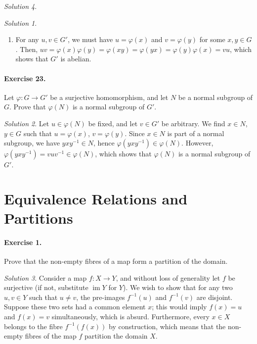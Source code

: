 \documentclass[11pt]{report}
\DeclareMathOperator\im{im}
\theoremstyle{remark}
\newtheorem*{solution}{Solution}
\begin{document}
\begin{solution}
\begin{solution}
\begin{enumerate}
        \item For any $u, v \in G'$, we must have $u = \varphi(x)$ and $v =
        \varphi(y)$ for some $x, y \in G$. Then, $uv = \varphi(x)\varphi(y) =
        \varphi(xy) = \varphi(yx) = \varphi(y)\varphi(x) = vu$, which shows that
        $G'$ is abelian.
    \end{enumerate}    
    \end{solution}
    
    \paragraph{Exercise 23.} Let $\varphi\colon G \to G'$ be a surjective
    homomorphism, and let $N$ be a normal subgroup of $G$. Prove that $\varphi(N)$
    is a normal subgroup of $G'$.
    \begin{solution}
        Let $u \in \varphi(N)$ be fixed, and let $v \in G'$ be arbitrary. We find
        $x \in N$, $y \in G$ such that $u = \varphi(x)$, $v = \varphi(y)$. Since $x
        \in N$ is part of a normal subgroup, we have $yxy^{-1} \in N$, hence
        $\varphi(yxy^{-1}) \in \varphi(N)$. However, $\varphi(yxy^{-1}) = vuv^{-1}
        \in \varphi(N)$, which shows that $\varphi(N)$ is a normal subgroup of $G'$.
    \end{solution}
    

    \section{Equivalence Relations and Partitions}

    \paragraph{Exercise 1.} Prove that the non-empty fibres of a map form a
    partition of the domain.
    \begin{solution}
        Consider a map $f\colon X \to Y$, and without loss of generality let $f$ be
        surjective (if not, substitute $\im{Y}$ for $Y$). We wish to show that for
        any two $u, v \in Y$ such that $u \neq v$, the pre-images $f^{-1}(u)$ and
        $f^{-1}(v)$ are disjoint. Suppose these two sets had a common element $x$;
        this would imply $f(x) = u$ and $f(x) = v$ simultaneously, which is absurd.
        Furthermore, every $x \in X$ belongs to the fibre $f^{-1}(f(x))$ by
        construction, which means that the non-empty fibres of the map $f$ partition
        the domain $X$.
    \end{solution}


\end{solution}
\end{document}
